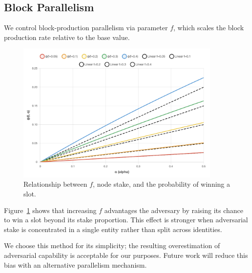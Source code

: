 \subsection{Block Parallelism}
We control block-production parallelism via parameter $f$, which scales the block production rate relative to the base value.

\begin{figure}[htbp!]
\includegraphics[width=0.9\textwidth]{figs/f-parallelism-bias.png}
\caption{Relationship between $f$, node stake, and the probability of winning a slot.}
\label{fig:f-parallelism-bias}
\end{figure}
Figure~\ref{fig:f-parallelism-bias} shows that increasing $f$ advantages the adversary by raising its chance to win a slot beyond its stake proportion. This effect is stronger when adversarial stake is concentrated in a single entity rather than split across identities.


We choose this method for its simplicity; the resulting overestimation of adversarial capability is acceptable for our purposes. Future work will reduce this bias with an alternative parallelism mechanism.


